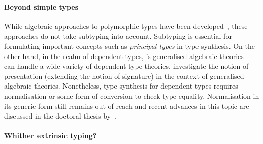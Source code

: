 \paragraph{Beyond simple types}
While algebraic approaches to polymorphic types have been developed~\citep{Fiore2013,Hamana2011}, these approaches do not take subtyping into account.
Subtyping is essential for formulating important concepts such as \emph{principal types} in type synthesis.
On the other hand, in the realm of dependent types, \citeauthor{Cartmell1986}'s generalised algebraic theories~\citeyearpar{Cartmell1986} can handle a wide variety of dependent type theories.
\citet{Bezem2021} investigate the notion of presentation (extending the notion of signature) in the context of generalised algebraic theories.
Nonetheless, type synthesis for dependent types requires normalisation or some form of conversion to check type equality.
Normalisation in its generic form still remains out of reach and recent advances in this topic are discussed in the doctoral thesis by~\citet{Valliappan2023}.

\paragraph{Whither extrinsic typing?}



%


